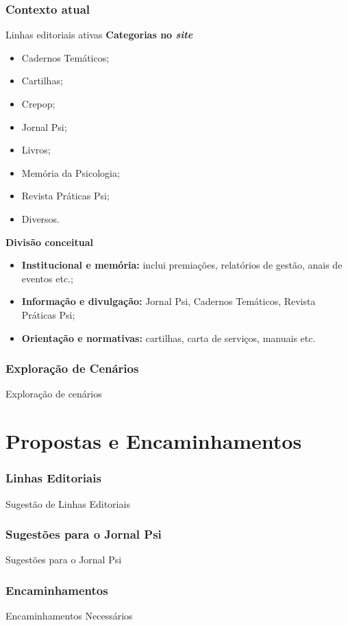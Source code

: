 \documentclass{beamer}
\begin{document}
\section{Contexto atual}
\begin{frame}{Linhas editoriais ativas}
    \normalsize
    \textbf{Categorias no \textit{site}}
    \scriptsize
    \begin{itemize}
        \item Cadernos Temáticos;
        \item Cartilhas;
        \item Crepop;
        \item Jornal Psi;
        \item Livros;
        \item Memória da Psicologia;
        \item Revista Práticas Psi;
        \item Diversos.
    \end{itemize}
    \normalsize
    \textbf{Divisão conceitual}
    \scriptsize
    \begin{itemize}
        \item \textbf{Institucional e memória:} inclui premiações, relatórios de gestão, anais de eventos etc.;
        \item \textbf{Informação e divulgação:} Jornal Psi, Cadernos Temáticos, Revista Práticas Psi;
        \item \textbf{Orientação e normativas:} cartilhas, carta de serviços, manuais etc.
    \end{itemize}
\end{frame}

\section{Exploração de Cenários}
\begin{frame}{Exploração de cenários}
\end{frame}

\part{Propostas e Encaminhamentos}

\section{Linhas Editoriais}
\begin{frame}{Sugestão de Linhas Editoriais}
\end{frame}

\section{Sugestões para o Jornal Psi}
\begin{frame}{Sugestões para o Jornal Psi}
\end{frame}

\section{Encaminhamentos}
\begin{frame}{Encaminhamentos Necessários}
\end{frame}
\end{document}

